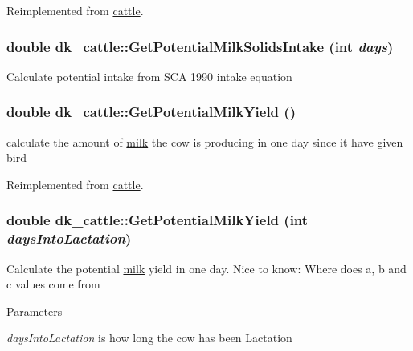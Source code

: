 Reimplemented from \hyperlink{classcattle_aee7aea077f7f8fd48035eae6308bdabc}{cattle}.\hypertarget{classdk__cattle_acc1c7aa22dd7ef017d1ab063bd180f35}{
\subsubsection[{GetPotentialMilkSolidsIntake}]{\setlength{\rightskip}{0pt plus 5cm}double dk\_\-cattle::GetPotentialMilkSolidsIntake (int {\em days})}}
\label{classdk__cattle_acc1c7aa22dd7ef017d1ab063bd180f35}
Calculate potential intake from SCA 1990 intake equation \hypertarget{classdk__cattle_aba7df82a62a25f831a662e6377f97224}{
\subsubsection[{GetPotentialMilkYield}]{\setlength{\rightskip}{0pt plus 5cm}double dk\_\-cattle::GetPotentialMilkYield ()}}
\label{classdk__cattle_aba7df82a62a25f831a662e6377f97224}
calculate the amount of \hyperlink{classmilk}{milk} the cow is producing in one day since it have given bird 

Reimplemented from \hyperlink{classcattle_a325c1edad49aee895e01d87f0c44bf64}{cattle}.\hypertarget{classdk__cattle_a33782ebe3783a6ef6ff393b0803c53b4}{
\subsubsection[{GetPotentialMilkYield}]{\setlength{\rightskip}{0pt plus 5cm}double dk\_\-cattle::GetPotentialMilkYield (int {\em daysIntoLactation})}}
\label{classdk__cattle_a33782ebe3783a6ef6ff393b0803c53b4}
Calculate the potential \hyperlink{classmilk}{milk} yield in one day. Nice to know: Where does a, b and c values come from 
\begin{DoxyParams}{Parameters}
\item[{\em daysIntoLactation}]is how long the cow has been Lactation \end{DoxyParams}


